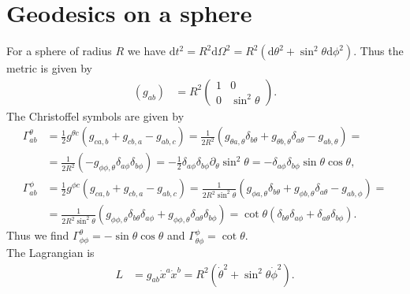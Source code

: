 \documentclass[english, parskip=full]{scrartcl}
\title{\titel}
\author{\autor}
\date{\today}
\newcommand{\kla}{}
\newcommand{\tecxt}{}
\begin{document}
\maketitle  %


\section{Geodesics on a sphere}
For a sphere of radius $R$ we have $\tecxt\text{d}t^2 = R^2\tecxt\text{d}\Omega^2 = R^2 \kla\left( \tecxt\text{d}\theta^2 + \sin^2\theta \tecxt\text{d}\phi^2 \right)$.
Thus the metric is given by
\begin{align}
(g_{ab}) &= R^2 \begin{pmatrix}
1 & 0 \\ 0 & \sin^2\theta
\end{pmatrix}.
\end{align}
The Christoffel symbols are given by
\begin{align}
\Gamma^\theta_{ab} &= \frac{1}{2}g^{\theta c} \kla\left( g_{ca,b} + g_{cb,a} - g_{ab,c} \right) = \frac{1}{2R^2}\kla\left( g_{\theta a,\theta} \delta_{b\theta} + g_{\theta b,\theta} \delta_{a\theta} - g_{ab,\theta} \right) = \\
&= \frac{1}{2R^2} (-g_{\phi\phi,\theta}\delta_{a\phi} \delta_{b\phi}) = -\frac{1}{2}\delta_{a\phi} \delta_{b\phi}\partial_\theta \sin^2\theta = -\delta_{a\phi} \delta_{b\phi}\sin\theta\cos\theta ,\\
\Gamma^\phi_{ab} &= \frac{1}{2}g^{\phi c} \kla\left( g_{ca,b} + g_{cb,a} - g_{ab,c} \right) = \frac{1}{2R^2 \sin^2\theta}\kla\left( g_{\phi a,\theta} \delta_{b\theta} + g_{\phi b,\theta} \delta_{a\theta} - g_{ab,\phi} \right) = \\
&= \frac{1}{2R^2 \sin^2\theta} (g_{\phi\phi,\theta} \delta_{b\theta}\delta_{a\phi} + g_{\phi\phi,\theta} \delta_{a\theta} \delta_{b\phi}) = \cot\theta \kla\left( \delta_{b\theta} \delta_{a\phi} + \delta_{a\theta} \delta_{b\phi} \right).
\end{align}
Thus we find $\Gamma^\theta_{\phi\phi} = -\sin\theta\cos\theta$ and $\Gamma^\phi_{\theta\phi} = \cot\theta$.
\\
The Lagrangian is 
\begin{align}
L &= g_{ab}\dot{x}^a \dot{x}^b = R^2\kla\left( \dot{\theta}^2 + \sin^2\theta \dot{\phi}^2 \right).
\end{align}
\end{document}

